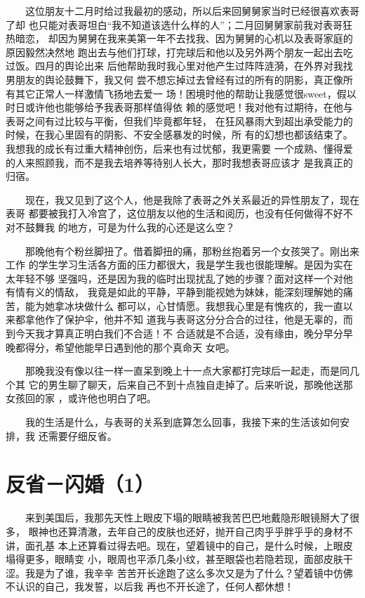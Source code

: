 \documentclass[12pt]{book}
\begin{document}
　　这位朋友十二月时给过我最初的感动，所以后来回舅舅家当时已经很喜欢表哥了却
也只能对表哥坦白“我不知道该选什么样的人”；二月回舅舅家前我对表哥狂热暗恋，
却因为舅舅在我来美第一年不去找我、因为舅舅的心机以及表哥家庭的原因毅然决然地
跑出去与他们打球，打完球后和他以及另外两个朋友一起出去吃过饭。四月的舆论出来
后他帮助我时我心里对他产生过阵阵涟漪，在外界对我找男朋友的舆论鼓舞下，我又何
尝不想忘掉过去曾经有过的所有的阴影，真正像所有其它正常人一样激情飞扬地去爱一
场！困境时他的帮助让我感觉很sweet，假以时日或许他也能够给予我表哥那样值得依
赖的感觉吧！我对他有过期待，在他与表哥之间有过比较与平衡，但我们毕竟都年轻，
在狂风暴雨大到超出承受能力的时候，在我心里固有的阴影、不安全感暴发的时候，所
有的幻想也都该结束了。我想我的成长有过重大精神创伤，后来也有过忧郁，我更需要
一个成熟、懂得爱的人来照顾我，而不是我去培养等待别人长大，那时我想表哥应该才
是我真正的归宿。

　　现在，我又见到了这个人，他是我除了表哥之外关系最近的异性朋友了，现在表哥
都要被我打入冷宫了，这位朋友以他的生活和阅历，也没有任何做得不好不对不鼓舞我
的地方，可是为什么我的心还是这么空？

　　那晚他有个粉丝脚扭了。借着脚扭的痛，那粉丝抱着另一个女孩哭了。刚出来工作
的学生学习生活各方面的压力都很大，我是学生我也很能理解。是因为实在太年轻不够
坚强吗，还是因为我的临时出现扰乱了她的步骤？面对这样一个对他有情有义的情敌，
我竟是如此的平静，平静到能视她为妹妹，能深刻理解她的痛苦，能为她拿冰块做什么
都可以，心甘情愿。我想我心里是有愧疚的，我一直以来都拿他作了保护伞，他并不知
道我与表哥这分分合合的过往，他是无辜的，而到今天我才算真正明白我们不合适！不
合适就是不合适，没有缘由，晚分早分早晚都得分，希望他能早日遇到他的那个真命天
女吧。

　　那晚我没有像以往一样一直呆到晚上十一点大家都打完球后一起走，而是同几个其
它的男生聊了聊天，后来自己不到十点独自走掉了。后来听说，那晚他送那女孩回的家
，或许他也明白了吧。

　　我的生活是什么，与表哥的关系到底算怎么回事，我接下来的生活该如何安排，我
还需要仔细反省。
\section{反省－闪婚（1）}
\label{sec-8-23}

　　来到美国后，我那先天性上眼皮下塌的眼睛被我苦巴巴地戴隐形眼镜掰大了很多，
眼神也还算清澈，去年自己的皮肤也还好，抛开自己肉乎乎胖乎乎的身材不讲，面孔基
本上还算看过得去吧。现在，望着镜中的自己，是什么时候，上眼皮塌得更多，眼睛变
小，眼周也平添几条小纹，甚至眼袋也若隐若现，面部皮肤干涩。我是为了谁，我辛辛
苦苦开长途跑了这么多次又是为了什么？望着镜中仿佛不认识的自己，我发誓，以后我
再也不开长途了，任何人都休想！
\end{document}

